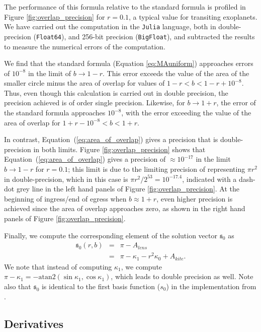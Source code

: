 \documentclass[modern,trackchanges]{aastex63}
\newcommand{\edited}{}
\begin{document}
The performance of this formula relative to the standard formula is profiled
in Figure \ref{fig:overlap_precision} for $r=0.1$, a typical
value for transiting exoplanets.  We have carried out
the computation in the \texttt{Julia} language, both in double-precision
(\texttt{Float64}), and 256-bit precision (\texttt{BigFloat}), and
subtracted the results to measure the numerical errors of the computation.

We find that the standard
formula (Equation \ref{eq:MAuniform}) approaches errors of $10^{-8}$
in the limit of $b \rightarrow 1-r$. This error exceeds the value
of the area of the smaller circle minus the area of overlap for
values of $1-r < b < 1-r+10^{-8}$.  Thus, even though this calculation
is carried out in double precision, the precision achieved is of
order single precision.  Likewise, for $b \rightarrow 1+r$,
the error of the standard formula approaches $10^{-8}$, with the
error exceeding the value of the area of overlap for $1+r-10^{-8} <
b < 1+r$.

In contrast, Equation~(\ref{eq:area_of_overlap}) gives a precision
that is double-precision in both limits.  Figure
\ref{fig:overlap_precision} shows that Equation~(\ref{eq:area_of_overlap})
gives a precision of $\approx 10^{-17}$ in the limit $b \rightarrow
1-r$ for $r=0.1$; this limit is due to the limiting precision of
representing $\pi r^2$ in double-precision, which in this case
is $\pi r^2 / 2^{53} = 10^{-17.4}$, indicated with a dash-dot
grey line in the left hand panels of Figure \ref{fig:overlap_precision}.
At the beginning of ingress/end of egress when $b \approx 1+r$,
even higher precision is achieved since the area of overlap approaches
zero, as shown in the right hand panels of Figure \ref{fig:overlap_precision}.

Finally, we compute the corresponding element of the solution vector $\mathfrak{s}_0$
as
%
\begin{eqnarray} \label{eq:uniform}
    \label{eq:s0}
    \mathfrak{s}_0(r,b) &=& \pi-A_{lens}\nonumber\\
                        &=&\pi -\kappa_1 - r^2\kappa_0 + A_{kite}.
\end{eqnarray}
%
We note that instead of computing $\kappa_1$,
we compute $\pi-\kappa_1 = -\mathrm{atan2}(\sin{\kappa_1},\cos{\kappa_1})$,
which leads to {\edited double} precision as well. Note also that $\mathfrak{s}_0$ is
identical to the first basis function ($s_0$) in the \starry implementation
from \citet{starry}.

\subsection{Derivatives}
\end{document}
